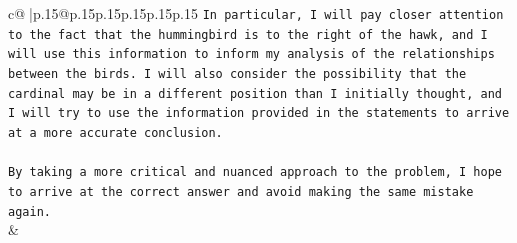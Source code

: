\documentclass{article}
\begin{document}
{\begin{supertabular}{c@{$\;$}|p{.15\linewidth}@{}p{.15\linewidth}p{.15\linewidth}p{.15\linewidth}p{.15\linewidth}p{.15\linewidth}}
{{{\texttt{In particular, I will pay closer attention to the fact that the hummingbird is to the right of the hawk, and I will use this information to inform my analysis of the relationships between the birds. I will also consider the possibility that the cardinal may be in a different position than I initially thought, and I will try to use the information provided in the statements to arrive at a more accurate conclusion.} \\
\\ 
\texttt{By taking a more critical and nuanced approach to the problem, I hope to arrive at the correct answer and avoid making the same mistake again.} \\
            }
        }
    }
    & \\ \\

\end{supertabular}
}
\end{document}
